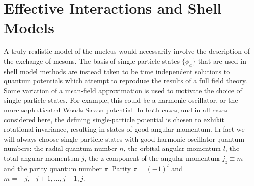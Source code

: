 \section{Effective Interactions and Shell Models}
\label{EISM}
A truly realistic model of the nucleus would necessarily involve the description of the exchange of 
mesons\cite{eisenberg}. The basis of single particle states $\{\phi_a\}$ that 
are used in shell model methods are instead taken to be time independent
solutions to quantum potentials which attempt to reproduce the results of a
full field theory.
Some variation of a mean-field approximation is used to motivate the choice
of single particle states.
For example, this could be a harmonic oscillator, or the more sophisticated
Woods-Saxon potential\cite{Brussard}. In both cases, and in all cases considered
here, the defining single-particle potential is chosen to exhibit rotational invariance,
resulting in states of good angular momentum. In fact we will always choose
single particle states with good harmonic oscillator 
quantum numbers: the radial quantum number $n$, the orbital angular momentum $l$,
the total angular momentum $j$, the
z-component of the angular momentum $j_z\equiv m$ and the parity quantum number
$\pi$. Parity $\pi=(-1)^l$ and $m=-j,-j+1,...,j-1,j$. 


